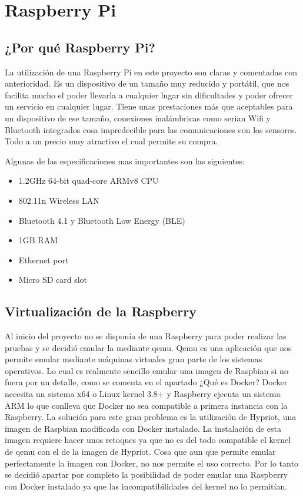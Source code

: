 \chapter{Raspberry Pi}

\section{¿Por qué Raspberry Pi?}

La utilización de una Raspberry Pi en este proyecto son claras y comentadas con anterioridad. 
Es un dispositivo de un tamaño muy reducido y portátil, que nos facilita mucho el poder llevarla a cualquier lugar sin dificultades y poder ofrecer un servicio en cualquier lugar.
Tiene unas prestaciones más que aceptables para un dispositivo de ese tamaño, conexiones inalámbricas como serian Wifi y Bluetooth integrados cosa impredecible para las comunicaciones con los sensores. Todo a un precio muy atractivo el cual permite su compra.  

Algunas de las especificaciones mas importantes son las siguientes:
\begin{itemize}
\item 1.2GHz 64-bit quad-core ARMv8 CPU
\item 802.11n Wireless LAN
\item Bluetooth 4.1 y Bluetooth Low Energy (BLE)
\item 1GB RAM
\item Ethernet port
\item Micro SD card slot 
\end{itemize}

\section{Virtualización de la Raspberry}

Al inicio del proyecto no se disponía de una Raspberry para poder realizar las pruebas y se decidió emular la mediante qemu. 
Qemu es una aplicación que nos permite emular mediante máquinas virtuales gran parte de los sistemas operativos. 
Lo cual es realmente sencillo emular una imagen de Raspbian si no fuera por un detalle, como se comenta en el apartado ¿Qué es Docker? Docker necesita un sistema x64 o Linux kernel 3.8+ y Raspberry ejecuta un sistema ARM lo que conlleva que Docker no sea compatible a primera instancia con la Raspberry. 
La solución para este gran problema es la utilización de Hypriot, una imagen de Raspbian modificada con Docker instalado. 
La instalación de esta imagen  requiere hacer unos retoques ya que no es del todo compatible el kernel de qemu con el de la imagen de Hypriot. Cosa que aun que permite emular perfectamente la imagen con Docker, no nos permite el uso correcto. Por lo tanto se decidió apartar por completo la posibilidad de poder emular una Raspberry con Docker instalado ya que las incompatibilidades del kernel no lo permitían.

